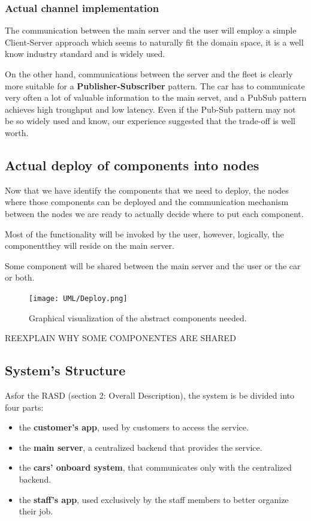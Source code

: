 \documentclass[11pt]{article} %
\begin{document}
\begin{description}
\subsubsection{Actual channel implementation}

The communication between the main server and the user will employ a simple Client-Server approach which seems to naturally fit the domain space, it is a well know industry standard and is widely used.

On the other hand, communications between the server and the fleet is clearly more suitable for a \textbf{Publisher-Subscriber} pattern. The car has to communicate very often a lot of valuable information to the main servet, and a PubSub pattern achieves high troughput and low latency. Even if the Pub-Sub pattern may not be so widely used and know, our experience suggested that the trade-off is well worth.

\subsection{Actual deploy of components into nodes}

Now that we have identify the components that we need to deploy, the nodes where those components can be deployed and the communication mechanism between the nodes we are ready to actually decide where to put each component.

Most of the functionality will be invoked by the user, however, logically, the componentthey will reside on the main server.

Some component will be shared between the main server and the user or the car or both.


\begin{figure}[H]
	\centering
	\texttt{[image: UML/Deploy.png]}
	\caption{Graphical visualization of the abstract components needed.}
\end{figure}	


REEXPLAIN WHY SOME COMPONENTES ARE SHARED





\subsection{System's Structure}

Asfor the RASD (section 2: Overall Description), the system is be divided into four parts:
\begin{itemize}[noitemsep]
	\item the \textbf{customer's app}, used by customers to access the service.
	\item the \textbf{main server}, a centralized backend that provides the service.
	\item the \textbf{cars’ onboard system}, that communicates only with the centralized backend.
	\item the \textbf{staff's app}, used exclusively by the staff members to better organize their job.
\end{itemize}


\end{description}
\end{document}
